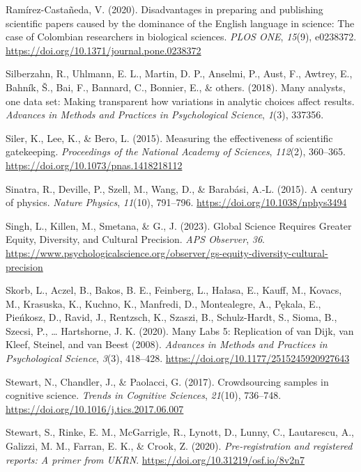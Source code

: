 \documentclass[
  man,floatsintext]{apa7}
\newlength{\cslhangindent}
\newenvironment{CSLReferences}[2] %
 {\begin{list}{}{%
  \setlength{\itemindent}{0pt}
  \setlength{\leftmargin}{0pt}
  \setlength{\parsep}{0pt}
  \ifodd #1
   \setlength{\leftmargin}{\cslhangindent}
   \setlength{\itemindent}{-1\cslhangindent}
  \fi
  \setlength{\itemsep}{#2\baselineskip}}}
 {\end{list}}
\begin{document}
\begin{CSLReferences}{1}{0}
Ramírez-Castañeda, V. (2020). Disadvantages in preparing and publishing scientific papers caused by the dominance of the English language in science: The case of Colombian researchers in biological sciences. \emph{PLOS ONE}, \emph{15}(9), e0238372. \url{https://doi.org/10.1371/journal.pone.0238372}

Silberzahn, R., Uhlmann, E. L., Martin, D. P., Anselmi, P., Aust, F., Awtrey, E., Bahník, Š., Bai, F., Bannard, C., Bonnier, E., \& others. (2018). Many analysts, one data set: Making transparent how variations in analytic choices affect results. \emph{Advances in Methods and Practices in Psychological Science}, \emph{1}(3), 337356.

Siler, K., Lee, K., \& Bero, L. (2015). Measuring the effectiveness of scientific gatekeeping. \emph{Proceedings of the National Academy of Sciences}, \emph{112}(2), 360--365. \url{https://doi.org/10.1073/pnas.1418218112}

Sinatra, R., Deville, P., Szell, M., Wang, D., \& Barabási, A.-L. (2015). A century of physics. \emph{Nature Physics}, \emph{11}(10), 791--796. \url{https://doi.org/10.1038/nphys3494}

Singh, L., Killen, M., Smetana, \& G., J. (2023). Global Science Requires Greater Equity, Diversity, and Cultural Precision. \emph{APS Observer}, \emph{36}. \url{https://www.psychologicalscience.org/observer/gs-equity-diversity-cultural-precision}

Skorb, L., Aczel, B., Bakos, B. E., Feinberg, L., Hałasa, E., Kauff, M., Kovacs, M., Krasuska, K., Kuchno, K., Manfredi, D., Montealegre, A., Pękala, E., Pieńkosz, D., Ravid, J., Rentzsch, K., Szaszi, B., Schulz-Hardt, S., Sioma, B., Szecsi, P., \ldots{} Hartshorne, J. K. (2020). Many Labs 5: Replication of van Dijk, van Kleef, Steinel, and van Beest (2008). \emph{Advances in Methods and Practices in Psychological Science}, \emph{3}(3), 418--428. \url{https://doi.org/10.1177/2515245920927643}

Stewart, N., Chandler, J., \& Paolacci, G. (2017). Crowdsourcing samples in cognitive science. \emph{Trends in Cognitive Sciences}, \emph{21}(10), 736--748. \url{https://doi.org/10.1016/j.tics.2017.06.007}

Stewart, S., Rinke, E. M., McGarrigle, R., Lynott, D., Lunny, C., Lautarescu, A., Galizzi, M. M., Farran, E. K., \& Crook, Z. (2020). \emph{Pre-registration and registered reports: A primer from UKRN}. \url{https://doi.org/10.31219/osf.io/8v2n7}


\end{CSLReferences}
\end{document}
